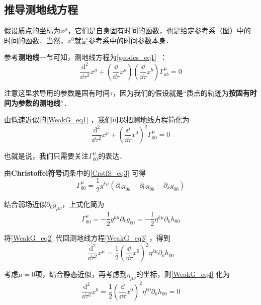 \subsection{推导测地线方程}

假设质点的坐标为$x^\mu$，它们是自身固有时间的函数，也是给定参考系（图）中的时间的函数．当然，$x^0$就是参考系中的时间参数本身．

参考\textbf{测地线}一节可知，测地线方程为\autoref{geodes_eq1}~：
\begin{equation}
\frac{\mathrm{d}^2}{\dd\tau^2}x^\mu+(\frac{\dd}{\dd\tau}x^a)(\frac{\dd}{\dd\tau}x^b)\Gamma^\mu_{ab}=0
\end{equation}

注意这里求导用的参数是固有时间$\tau$，因为我们的假设就是“质点的轨迹为\textbf{按固有时间为参数的测地线}”．

由低速近似的\autoref{WeakG_eq1} ，我们可以把测地线方程简化为
\begin{equation}\label{WeakG_eq3}
\frac{\mathrm{d}^2}{\dd\tau^2}x^\mu+(\frac{\dd}{\dd\tau}x^0)^2\Gamma^\mu_{00}=0
\end{equation}

也就是说，我们只需要关注$\Gamma^\mu_{00}$的表达．

由\textbf{Christoffel符号}词条中的\autoref{CrstfS_eq3} 可得
\begin{equation}
\Gamma^\mu_{00}=\frac{1}{2}g^{k\mu}(\partial_0g_{0k}+\partial_0g_{0k}-\partial_{k}g_{00})
\end{equation}

结合弱场近似$\partial_0g_{\mu\nu}$，上式化简为
\begin{equation}\label{WeakG_eq2}
\Gamma^\mu_{00}=-\frac{1}{2}g^{k\mu}\partial_{k}g_{00}=-\frac{1}{2}\eta^{k\mu}\partial_{k}h_{00}
\end{equation}

将\autoref{WeakG_eq2} 代回测地线方程\autoref{WeakG_eq3} ，得到
\begin{equation}\label{WeakG_eq4}
\frac{\mathrm{d}^2}{\dd\tau^2}x^\mu=\frac{1}{2}(\frac{\dd}{\dd\tau}x^0)^2\eta^{k\mu}\partial_{k}h_{00}
\end{equation}

考虑$\mu=0$项，结合静态近似，再考虑到$\eta_{\mu\nu}$的坐标，则\autoref{WeakG_eq4} 化为
\begin{equation}
\frac{\mathrm{d}^2}{\dd\tau^2}x^0=\frac{1}{2}(\frac{\dd}{\dd\tau}x^0)^2\eta^{k0}\partial_{k}h_{00}=0
\end{equation}

